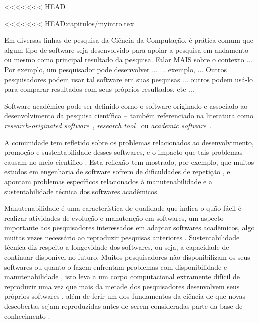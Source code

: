 
<<<<<<< HEAD

<<<<<<< HEAD:capitulos/myintro.tex

Em diversas linhas de pesquisa da Ciência da Computação, é prática comum que algum tipo de software seja desenvolvido para apoiar a pesquisa em andamento ou mesmo como principal resultado da pesquisa.
Falar MAIS sobre o contexto   ... Por exemplo, um pesquisador pode desenvolver ...
... exemplo,  ... Outros pesquisadores podem usar tal software em suas pesquisas ... outros podem usá-lo para comparar resultados com seus próprios resultados, etc ...

Software acadêmico pode ser definido como o software originado e associado ao desenvolvimento da pesquisa científica -- também referenciado na literatura como {\it research-originated software}~\cite{Kon2011}, {\it research tool}~\cite{Portillo12} ou {\it academic software}~\cite{allen2017engineering}. 

A comunidade tem refletido sobre os problemas relacionados ao
desenvolvimento, promoção e sustentabilidade desses softwares, e o
impacto que tais problemas causam no meio científico \cite{allen2017engineering}. Esta
reflexão tem mostrado, por exemplo, que muitos estudos em engenharia de
software sofrem de dificuldades de repetição \cite{Tang2016}, e apontam
problemas específicos relacionados à manutenabilidade e a sustentabilidade
técnica dos softwares acadêmicos.

Manutenabilidade é uma característica de qualidade que indica o quão fácil é
realizar atividades de evolução e manutenção em softwares, um aspecto
importante aos pesquisadores interessados em adaptar softwares acadêmicos, algo
muitas vezes necessário ao reproduzir pesquisas anteriores \cite{Peng2011}.
Sustentabilidade técnica diz respeito a longevidade dos softwares, ou seja, a
capacidade de continuar disponível no futuro. Muitos pesquisadores não
disponibilizam os seus softwares \cite{robles2010replicating,
amann2015software} ou quanto o fazem enfrentam problemas com disponibilidade e
manutenabilidade \cite{Prlic2012}, isto leva a um corpo computacional
extramente difícil de reproduzir uma vez que mais da metade dos pesquisadores
desenvolvem seus próprios softwares \cite{hettrick_2014_14809}, além de ferir um dos
fundamentos da ciência de que novas descobertas sejam reproduzidas antes de
serem consideradas parte da base de conhecimento \cite{Stodden2009}.

